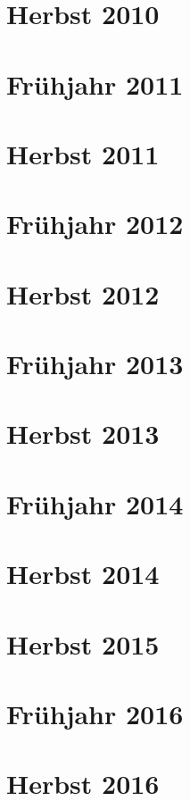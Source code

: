 \documentclass{lehramt-informatik-examen-sammlung}
\begin{document}
\section{Herbst 2010}


\section{Frühjahr 2011}


\section{Herbst 2011}


\section{Frühjahr 2012}


\section{Herbst 2012}


\section{Frühjahr 2013}


\section{Herbst 2013}


\section{Frühjahr 2014}


\section{Herbst 2014}


\section{Herbst 2015}


\section{Frühjahr 2016}


\section{Herbst 2016}

\end{document}
